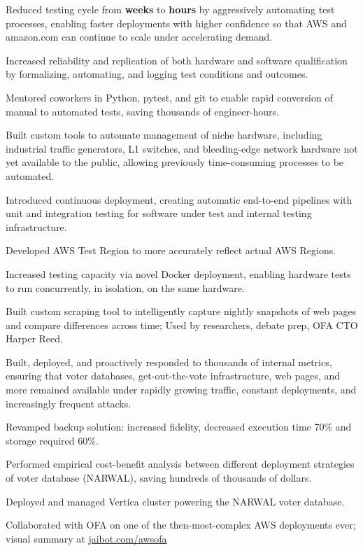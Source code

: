 \documentclass[]{resume}
\begin{document}
\begin{minipage}[t]{0.66\textwidth}
\begin{tightemize}
\item Reduced testing cycle from \textbf{weeks} to \textbf{hours} by aggressively automating test processes, enabling faster deployments with higher confidence so that AWS and amazon.com can continue to scale under accelerating demand.
\item Increased reliability and replication of both hardware and software qualification by formalizing, automating, and logging test conditions and outcomes.
\item Mentored coworkers in Python, pytest, and git to enable rapid conversion of manual to automated tests, saving thousands of engineer-hours.
\item Built custom tools to automate management of niche hardware, including industrial traffic generators, L1 switches, and bleeding-edge network hardware not yet available to the public, allowing previously time-consuming processes to be automated.
\item Introduced continuous deployment, creating automatic end-to-end pipelines with unit and integration testing for software under test and internal testing infrastructure.
\item Developed AWS Test Region to more accurately reflect actual AWS Regions.
\item Increased testing capacity via novel Docker deployment, enabling hardware tests to run concurrently, in isolation, on the same hardware.
\end{tightemize}
\sectionsep

\descript{}
\begin{tightemize}
\item Built custom scraping tool to intelligently capture nightly snapshots of web pages and compare differences across time; Used by researchers, debate prep, OFA CTO Harper Reed.
\item Built, deployed, and proactively responded to thousands of internal metrics, ensuring that voter databases, get-out-the-vote infrastructure, web pages, and more remained available under rapidly growing traffic, constant deployments, and increasingly frequent attacks.
\item Revamped backup solution: increased fidelity, decreased execution time 70\% and storage required 60\%.
\item Performed empirical cost-benefit analysis between different deployment strategies of voter database (NARWAL), saving hundreds of thousands of dollars.
\item Deployed and managed Vertica cluster powering the NARWAL voter database.
\item Collaborated with OFA on one of the then-most-complex AWS deployments ever; visual summary at \href{http://www.jaibot.com/awsofa}{jaibot.com/awsofa}
\end{tightemize}
\sectionsep


\end{minipage}
\end{document}
